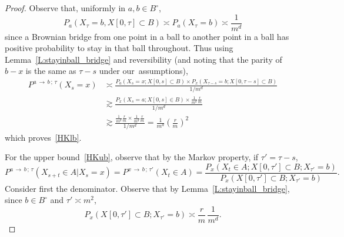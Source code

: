 \documentclass[AHL, Unicode, longabstracts, published]{cedram}
\newcommand{\Pmh}{P}
\begin{document}
\begin{proof}
Observe that, uniformly in $a, b \in B^\circ$,
\[
\Pmh_a(X_\tau = b, X[0,\tau] \subset B) \asymp \Pmh_a(X_\tau = b) \asymp \frac1{m^d}
\]
since a Brownian bridge from one point in a ball to another point in a ball has positive probability to stay in that ball throughout. Thus using Lemma~\ref{L:stayinball_bridge} and reversibility (and noting that the parity of $b - x$ is the same as $\tau -s$ under our~assumptions),
\begin{align*}
\Pmh^{a\,\to\,b\,;\,\tau} (X_s = x) &\asymp \frac{\Pmh_a (X_s = x; X[0, s] \subset B) \times \Pmh_x (X_{\tau - s} = b ; X[0, \tau - s] \subset B)}{1/m^d}\\
& \gtrsim \frac{\Pmh_x (X_s = a; X[0,s] \in B) \times \tfrac{1}{m^d} \tfrac{r}{m}}{1/m^d}\\
& \gtrsim \frac{\tfrac{1}{m^d}{ \tfrac{r}{m} \times \tfrac{1}{m^d} \tfrac{r}{m}}}{1/m^d} = \tfrac{1}{m^d} \left(\tfrac{r}{m}\right)^2
\end{align*}
which proves~\eqref{HKlb}.

For the upper bound~\eqref{HKub}, observe that by the Markov property, if $\tau' = \tau -s $,
\[
\Pmh^{a\,\to\,b\,;\,\tau}(X_{s+t} \in A |X_s=x)\! =\!\Pmh^{x\,\to\,b\,;\,\tau'} (X_t \in A) = \frac{\Pmh_x(X_t \in A ; X[0, \tau'] \subset B ; X_{\tau'} = b)}{\Pmh_x (X[0, \tau'] \subset B; X_{\tau'} = b)}.
\]
Consider first the denominator. Observe that by Lemma~\ref{L:stayinball_bridge}, since $b \in B^\circ$ and $\tau'\asymp m^2$,
\[
\Pmh_x (X[0, \tau'] \subset B; X_{\tau'} = b) \asymp \frac{r}{m}\,\frac1{m^d}.
\]



\end{proof}
\end{document}
